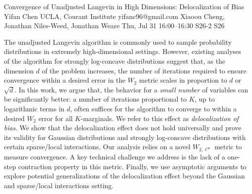 \documentclass[12pt,lettersize,oneside]{book} %
\begin{document}
\begin{talk}
\medskip


\end{talk}

\begin{talk}
  {Convergence of Unadjusted Langevin in High Dimensions: Delocalization of Bias}%
  {Yifan Chen}%
  {UCLA, Courant Institute}%
  {yifanc96@gmail.com}%
  {Xiaoou Cheng, Jonathan Niles-Weed, Jonathan Weare}%
  {}%
  {Thu, Jul 31 16:00--16:30}%
  {S26-2}%
  {S26}%
  
    
   
The unadjusted Langevin algorithm is commonly used to sample probability distributions in extremely high-dimensional settings. However, existing analyses of the algorithm for strongly log-concave distributions suggest that, as the dimension $d$ of the problem increases, the number of iterations required to ensure convergence within a desired error in the $W_2$ metric scales in proportion to $d$ or $\sqrt{d}$. In this work, we argue that, the behavior for a \emph{small number} of variables can be significantly better: a number of iterations proportional to $K$, up to logarithmic terms in $d$,
often suffices for the algorithm to converge to within a desired $W_2$ error for all $K$-marginals.
We refer to this effect as 
\textit{delocalization of bias}. 
We show that the delocalization effect does not hold universally and prove its validity for Gaussian distributions and strongly log-concave distributions with certain sparse/local interactions. Our analysis relies on a novel $W_{2,\ell^\infty}$ metric to measure convergence. A key technical challenge we address is the lack of a one-step contraction property in this metric. Finally, we use asymptotic arguments to explore potential generalizations of the delocalization effect beyond the Gaussian and sparse/local interactions setting.

\end{talk}
\end{document}
